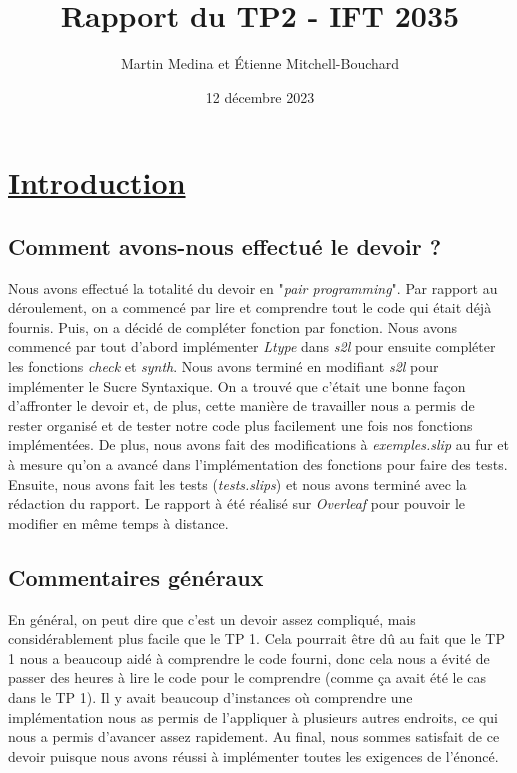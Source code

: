 \documentclass{article}
\title{Rapport du TP2 - IFT 2035}
\author{Martin Medina et Étienne Mitchell-Bouchard}
\date{12 décembre 2023}
\begin{document}
\maketitle


\section{\underline{Introduction}}

\subsection{Comment avons-nous effectué le devoir ?}

Nous avons effectué la totalité du devoir en "\textit{pair programming}". Par rapport au déroulement, on a commencé par lire et comprendre tout le code qui était déjà fournis. Puis, on a décidé de compléter fonction par fonction. Nous avons commencé par tout d'abord implémenter \textit{Ltype} dans \textit{s2l} pour ensuite compléter les fonctions \textit{check} et \textit{synth}. Nous avons terminé en modifiant \textit{s2l} pour implémenter le Sucre Syntaxique. On a trouvé que c'était une bonne façon d'affronter le devoir et, de plus, cette manière de travailler nous a permis de rester organisé et de tester notre code plus facilement une fois nos fonctions implémentées. De plus, nous avons fait des modifications à \textit{exemples.slip} au fur et à mesure qu'on a avancé dans l'implémentation des fonctions pour faire des tests. Ensuite, nous avons fait les tests (\textit{tests.slips}) et nous avons terminé avec la rédaction du rapport. Le rapport à été réalisé sur \textit{Overleaf} pour pouvoir le modifier en même temps à distance. 

\subsection{Commentaires généraux}

En général, on peut dire que c'est un devoir assez compliqué, mais considérablement plus facile que le TP 1. Cela pourrait être dû au fait que le TP 1 nous a beaucoup aidé à comprendre le code fourni, donc cela nous a évité de passer des heures à lire le code pour le comprendre (comme ça avait été le cas dans le TP 1). Il y avait beaucoup d'instances où comprendre une implémentation nous as permis de l'appliquer à plusieurs autres endroits, ce qui nous a permis d'avancer assez rapidement. Au final, nous sommes satisfait de ce devoir puisque nous avons réussi à implémenter toutes les exigences de l'énoncé.
\end{document}
